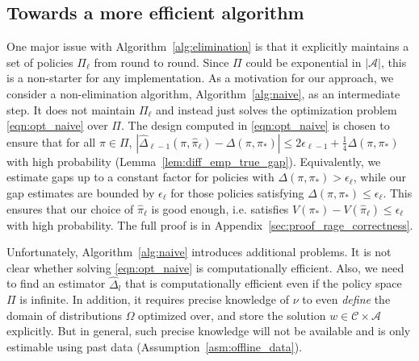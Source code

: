 \documentclass{article}
\newcommand{\mc}[1]{\mathcal{#1}}
\newcommand{\1}{\mathbf{1}}
\begin{document}
\subsection{Towards a more efficient algorithm}\label{sec:more_efficient}

One major issue with  Algorithm~\ref{alg:elimination} is that it explicitly maintains a set of policies $\Pi_\ell$ from round to round. Since $\Pi$ could be exponential in $|\mc{A}|$, this is a non-starter for any implementation. 
As a motivation for our approach, we consider a non-elimination algorithm, Algorithm~\ref{alg:naive}, as an intermediate step. It does not maintain $\Pi_{\ell}$ and instead just solves the optimization problem \eqref{eqn:opt_naive} over $\Pi$. The design computed in \eqref{eqn:opt_naive} is chosen to ensure that for all $\pi\in \Pi$, $|\hat{\Delta}_{\ell-1}(\pi, \hat{\pi}_{\ell}) - \Delta(\pi, \pi_{\ast})|\leq 2\epsilon_{\ell-1} + \frac{1}{4}\Delta(\pi, \pi_{\ast})$ with high probability (Lemma~\ref{lem:diff_emp_true_gap}). Equivalently, we estimate gaps up to a constant factor for policies with $\Delta(\pi, \pi_{\ast}) > \epsilon_{\ell}$, while our gap estimates are bounded by $\epsilon_{\ell}$ for those policies satisfying $\Delta(\pi, \pi_{\ast}) \leq \epsilon_{\ell}$. This ensures that our choice of $\hat\pi_{\ell}$ is good enough, i.e. satisfies $V(\pi_{\ast}) - V(\hat{\pi}_{\ell}) \leq \epsilon_{\ell}$ with high probability. The full proof is in Appendix~\ref{sec:proof_rage_correctness}.

Unfortunately, Algorithm~\ref{alg:naive} introduces additional problems. It is not clear whether solving \eqref{eqn:opt_naive} is computationally efficient. Also, we need to find an estimator $\hat{\Delta}_l$ that is computationally efficient even if the policy space $\Pi$ is infinite. In addition, it requires precise knowledge of $\nu$ to even \emph{define} the domain of distributions $\Omega$ optimized over, and store the solution $w \in \mc{C} \times \mc{A}$ explicitly. But in general, such precise knowledge will not be available and is only estimable using past data (Assumption~\ref{asm:offline_data}). 









\end{document}
